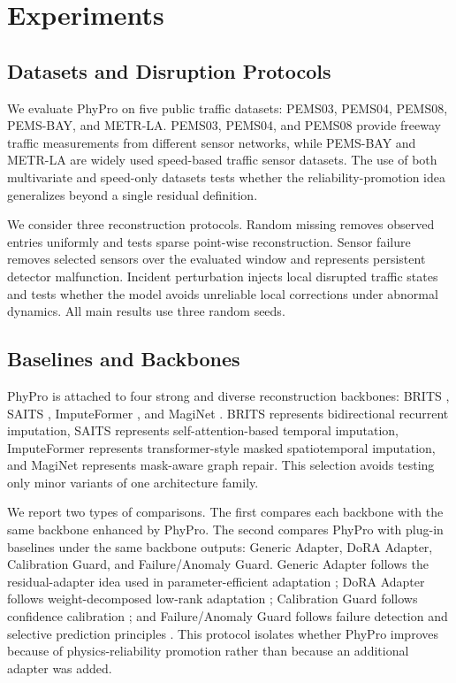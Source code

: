 \documentclass[preprint,12pt]{elsarticle}
\begin{document}
\section{Experiments}

\subsection{Datasets and Disruption Protocols}
We evaluate PhyPro on five public traffic datasets: PEMS03, PEMS04, PEMS08, PEMS-BAY, and METR-LA. PEMS03, PEMS04, and PEMS08 provide freeway traffic measurements from different sensor networks, while PEMS-BAY and METR-LA are widely used speed-based traffic sensor datasets. The use of both multivariate and speed-only datasets tests whether the reliability-promotion idea generalizes beyond a single residual definition.

We consider three reconstruction protocols. Random missing removes observed entries uniformly and tests sparse point-wise reconstruction. Sensor failure removes selected sensors over the evaluated window and represents persistent detector malfunction. Incident perturbation injects local disrupted traffic states and tests whether the model avoids unreliable local corrections under abnormal dynamics. All main results use three random seeds.

\subsection{Baselines and Backbones}
PhyPro is attached to four strong and diverse reconstruction backbones: BRITS \citep{cao2018brits}, SAITS \citep{du2023saits}, ImputeFormer \citep{liu2024imputeformer}, and MagiNet \citep{liu2025maginet}. BRITS represents bidirectional recurrent imputation, SAITS represents self-attention-based temporal imputation, ImputeFormer represents transformer-style masked spatiotemporal imputation, and MagiNet represents mask-aware graph repair. This selection avoids testing only minor variants of one architecture family.

We report two types of comparisons. The first compares each backbone with the same backbone enhanced by PhyPro. The second compares PhyPro with plug-in baselines under the same backbone outputs: Generic Adapter, DoRA Adapter, Calibration Guard, and Failure/Anomaly Guard. Generic Adapter follows the residual-adapter idea used in parameter-efficient adaptation \citep{houlsby2019adapter}; DoRA Adapter follows weight-decomposed low-rank adaptation \citep{liu2024dora}; Calibration Guard follows confidence calibration \citep{guo2017calibration}; and Failure/Anomaly Guard follows failure detection and selective prediction principles \citep{hendrycks2017baseline,geifman2019selectivenet}. This protocol isolates whether PhyPro improves because of physics-reliability promotion rather than because an additional adapter was added.
\end{document}
